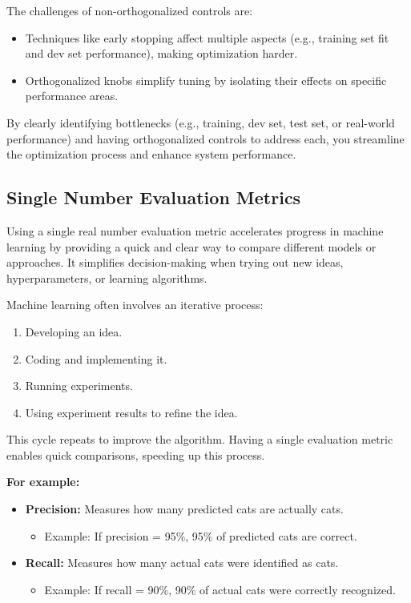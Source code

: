 \documentclass[letterpaper,12pt,notitlepage,twoside]{report}
\begin{document}
The challenges of non-orthogonalized controls are:
\begin{itemize}[noitemsep, topsep=0pt]
\item Techniques like early stopping affect multiple aspects (e.g., training set fit and dev set performance), making optimization harder.
\item Orthogonalized knobs simplify tuning by isolating their effects on specific performance areas.
\end{itemize}

By clearly identifying bottlenecks (e.g., training, dev set, test set, or real-world performance) and having orthogonalized controls to address each, you streamline the optimization process and enhance system performance.

\subsection{Single Number Evaluation Metrics}
Using a single real number evaluation metric accelerates progress in machine learning by providing a quick and clear way to compare different models or approaches. It simplifies decision-making when trying out new ideas, hyperparameters, or learning algorithms.

Machine learning often involves an iterative process:
\begin{enumerate}[noitemsep, topsep=0pt]
    \item Developing an idea.
    \item Coding and implementing it.
    \item Running experiments.
    \item Using experiment results to refine the idea.
\end{enumerate}
This cycle repeats to improve the algorithm. Having a single evaluation metric enables quick comparisons, speeding up this process.

\textbf{For example:}
\begin{itemize}[noitemsep, topsep=0pt]
    \item \textbf{Precision:} Measures how many predicted cats are actually cats.  
        \begin{itemize}
            \item Example: If precision = 95\%, 95\% of predicted cats are correct.
        \end{itemize}
    \item \textbf{Recall:} Measures how many actual cats were identified as cats.  
        \begin{itemize}
            \item Example: If recall = 90\%, 90\% of actual cats were correctly recognized.
        \end{itemize}
\end{itemize}
\end{document}
